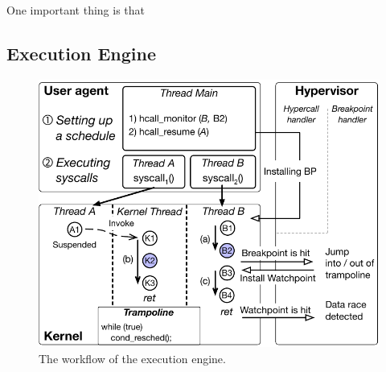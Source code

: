 One important thing is that 







\subsection{Execution Engine}
\label{ss:engine}

\begin{figure}
  \includegraphics[width=0.9\linewidth]{fig/workflow-hypervisor.pdf}
  \caption{The workflow of the execution engine. }
  \label{fig:workflow-hypervisor}
\end{figure}

